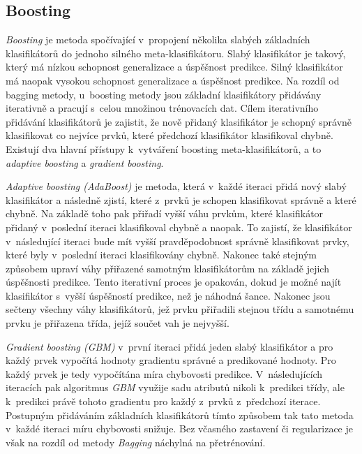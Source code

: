 \subsection*{Boosting}
\label{boosting}
\textit{Boosting} je metoda spočívající v~propojení několika slabých základních klasifikátorů do jednoho silného meta-klasifikátoru. Slabý klasifikátor je takový, který má nízkou schopnost generalizace a úspěšnost predikce. Silný klasifikátor má naopak vysokou schopnost generalizace a úspěšnost predikce. Na rozdíl od bagging metody, u~boosting metody jsou základní klasifikátory přidávány iterativně a pracují s~celou množinou trénovacích dat. Cílem iterativního přidávání klasifikátorů je zajistit, že nově přidaný klasifikátor je schopný správně klasifikovat co nejvíce prvků, které předchozí klasifikátor klasifikoval chybně. Existují dva hlavní přístupy k~vytváření boosting meta-klasifikátorů, a to \textit{adaptive boosting} a \textit{gradient boosting}.

\textit{Adaptive boosting (AdaBoost)} je metoda, která v~každé iteraci přidá nový slabý klasifikátor a následně zjistí, které z~prvků je schopen klasifikovat správně a které chybně. Na základě toho pak přiřadí vyšší váhu prvkům, které klasifikátor přidaný v~poslední iteraci klasifikoval chybně a naopak. To zajistí, že klasifikátor v~následující iteraci bude mít vyšší pravděpodobnost správně klasifikovat prvky, které byly v~poslední iteraci klasifikovány chybně. Nakonec také stejným způsobem upraví váhy přiřazené samotným klasifikátorům na základě jejich úspěšnosti predikce. Tento iterativní proces je opakován, dokud je možné najít klasifikátor s~vyšší úspěšností predikce, než je náhodná šance. Nakonec jsou sečteny všechny váhy klasifikátorů, jež prvku přiřadili stejnou třídu a samotnému prvku je přiřazena třída, jejíž součet vah je nejvyšší.

\textit{Gradient boosting (GBM)} v~první iteraci přidá jeden slabý klasifikátor a pro každý prvek vypočítá hodnoty gradientu správné a predikované hodnoty. Pro každý prvek je tedy vypočítána míra chybovosti predikce. V~následujících iteracích pak algoritmus \textit{GBM} využije sadu atributů nikoli k~predikci třídy, ale k~predikci právě tohoto gradientu pro každý z~prvků z~předchozí iterace. Postupným přidáváním základních klasifikátorů tímto způsobem tak tato metoda v~každé iteraci míru chybovosti snižuje. Bez včasného zastavení či regularizace je však na rozdíl od metody \textit{Bagging} náchylná na přetrénování.

